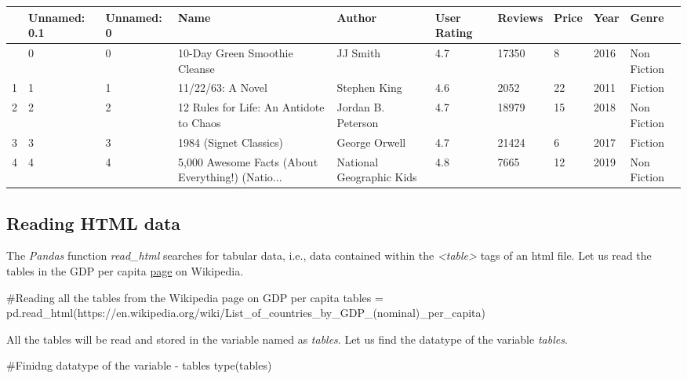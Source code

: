 \documentclass[
  letterpaper,
  DIV=11,
  numbers=noendperiod]{scrreprt}
\newenvironment{Shaded}{\begin{snugshade}}{\end{snugshade}}
\newcommand{\BuiltInTok}[1]{\textcolor[rgb]{0.00,0.23,0.31}{#1}}
\newcommand{\CommentTok}[1]{\textcolor[rgb]{0.37,0.37,0.37}{#1}}
\newcommand{\NormalTok}[1]{\textcolor[rgb]{0.00,0.23,0.31}{#1}}
\newcommand{\OperatorTok}[1]{\textcolor[rgb]{0.37,0.37,0.37}{#1}}
\newcommand{\StringTok}[1]{\textcolor[rgb]{0.13,0.47,0.30}{#1}}
\begin{document}
\begin{longtable}[]{@{}llllllllll@{}}
\toprule\noalign{}
& Unnamed: 0.1 & Unnamed: 0 & Name & Author & User Rating & Reviews &
Price & Year & Genre \\
\midrule\noalign{}
\endhead
\bottomrule\noalign{}
\endlastfoot
0 & 0 & 0 & 10-Day Green Smoothie Cleanse & JJ Smith & 4.7 & 17350 & 8 &
2016 & Non Fiction \\
1 & 1 & 1 & 11/22/63: A Novel & Stephen King & 4.6 & 2052 & 22 & 2011 &
Fiction \\
2 & 2 & 2 & 12 Rules for Life: An Antidote to Chaos & Jordan B. Peterson
& 4.7 & 18979 & 15 & 2018 & Non Fiction \\
3 & 3 & 3 & 1984 (Signet Classics) & George Orwell & 4.7 & 21424 & 6 &
2017 & Fiction \\
4 & 4 & 4 & 5,000 Awesome Facts (About Everything!) (Natio... & National
Geographic Kids & 4.8 & 7665 & 12 & 2019 & Non Fiction \\
\end{longtable}

\hypertarget{reading-html-data}{%
\subsection{Reading HTML data}\label{reading-html-data}}

The \emph{Pandas} function \emph{read\_html} searches for tabular data,
i.e., data contained within the \emph{\textless table\textgreater{}}
tags of an html file. Let us read the tables in the GDP per capita
\href{https://en.wikipedia.org/wiki/List_of_countries_by_GDP_(nominal)_per_capita}{page}
on Wikipedia.

\begin{Shaded}
\begin{Highlighting}[]
\CommentTok{\#Reading all the tables from the Wikipedia page on GDP per capita}
\NormalTok{tables }\OperatorTok{=}\NormalTok{ pd.read\_html(}\StringTok{\textquotesingle{}https://en.wikipedia.org/wiki/List\_of\_countries\_by\_GDP\_(nominal)\_per\_capita\textquotesingle{}}\NormalTok{)}
\end{Highlighting}
\end{Shaded}

All the tables will be read and stored in the variable named as
\emph{tables}. Let us find the datatype of the variable \emph{tables}.

\begin{Shaded}
\begin{Highlighting}[]
\CommentTok{\#Finidng datatype of the variable {-} tables}
\BuiltInTok{type}\NormalTok{(tables)}
\end{Highlighting}
\end{Shaded}
\end{document}

